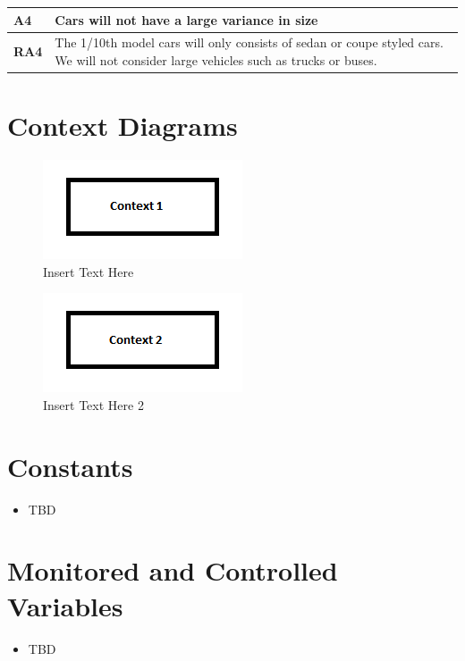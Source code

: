 \documentclass [11pt]{article}
\begin{document}
\begin{longtable}{| p{ } | p{ } | }\hline 
\textbf{A4} & \textbf{Cars will not have a large variance in size} \\ \hline
\textbf{RA4} &  The 1/10th model cars will only consists of sedan or coupe styled cars. We will not consider large vehicles such as trucks or buses.\\ \hline
\end{longtable}


\section{Context Diagrams}
\begin{figure} [h!]
	\centering
	\includegraphics [scale =1] {figures/context_1.png}
	\caption{Insert Text Here}
\end{figure}
\begin{figure} [h!]
	\centering
	\includegraphics [scale =1] {figures/context_2.png}
	\caption{Insert Text Here 2}
\end{figure}

\section{Constants}
\begin{itemize}
\item TBD

\end{itemize}


\section{Monitored and Controlled Variables}
\begin{itemize}
\item TBD

\end{itemize}
\end{document}
